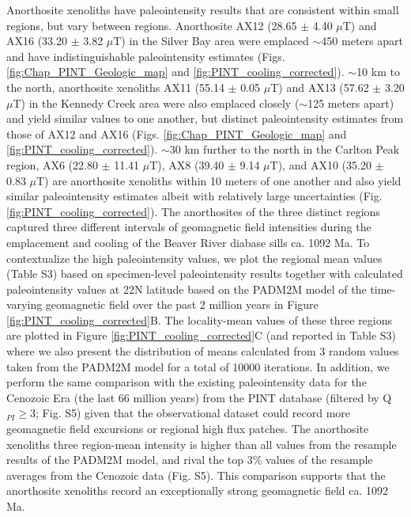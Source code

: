 Anorthosite xenoliths have paleointensity results that are consistent within small regions, but vary between regions. Anorthosite AX12 (28.65 $\pm$ 4.40 $\mu$T) and AX16 (33.20 $\pm$ 3.82 $\mu$T) in the Silver Bay area were emplaced $\sim$450 meters apart and have indistinguishable paleointensity estimates (Figs. \ref{fig:Chap_PINT_Geologic_map} and \ref{fig:PINT_cooling_corrected}). $\sim$10 km to the north, anorthosite xenoliths AX11 (55.14 $\pm$ 0.05 $\mu$T) and AX13 (57.62 $\pm$ 3.20 $\mu$T) in the Kennedy Creek area were also emplaced closely ($\sim$125 meters apart) and yield similar values to one another, but distinct paleointensity estimates from those of AX12 and AX16 (Figs. \ref{fig:Chap_PINT_Geologic_map} and \ref{fig:PINT_cooling_corrected}). $\sim$30 km further to the north in the Carlton Peak region, AX6 (22.80 $\pm$ 11.41 $\mu$T), AX8 (39.40 $\pm$ 9.14 $\mu$T), and AX10 (35.20 $\pm$ 0.83 $\mu$T) are anorthosite xenoliths within 10 meters of one another and also yield similar paleointensity estimates albeit with relatively large uncertainties (Fig. \ref{fig:PINT_cooling_corrected}). The anorthosites of the three distinct regions captured three different intervals of geomagnetic field intensities during the emplacement and cooling of the Beaver River diabase sills ca. 1092 Ma. To contextualize the high paleointensity values, we plot the regional mean values (Table S3) based on specimen-level paleointensity results together with calculated paleointensity values at 22\textdegree N latitude based on the PADM2M model of the time-varying geomagnetic field over the past 2 million years \citep{Ziegler2011a} in Figure \ref{fig:PINT_cooling_corrected}B. The locality-mean values of these three regions are plotted in Figure \ref{fig:PINT_cooling_corrected}C (and reported in Table S3) where we also present the distribution of means calculated from 3 random values taken from the PADM2M model for a total of 10000 iterations. In addition, we perform the same comparison with the existing paleointensity data for the Cenozoic Era (the last 66 million years) from the PINT database (filtered by Q$_{PI}\geq$3; Fig. S5) given that the observational dataset could record more geomagnetic field excursions or regional high flux patches. The anorthosite xenoliths three region-mean intensity is higher than all values from the resample results of the PADM2M model, and rival the top 3\% values of the resample averages from the Cenozoic data (Fig. S5). This comparison supports that the anorthosite xenoliths record an exceptionally strong geomagnetic field ca. 1092 Ma.

